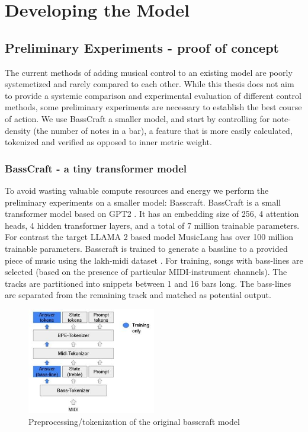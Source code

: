 \section{Developing the Model}

\subsection{Preliminary Experiments - proof of concept}
The current methods of adding musical control to an existing model are poorly systemetized and rarely compared to each other. While this thesis does not aim to provide a systemic comparison and experimental evaluation of different control methods, some preliminary experiments are necessary to establish the best course of action. We use BassCraft a smaller model, and start by controlling for note-density (the number of notes in a bar), a feature that is more easily calculated, tokenized and verified as opposed to inner metric weight.  

\subsubsection{BassCraft -  a tiny transformer model}
To avoid wasting valuable compute resources and energy we perform the preliminary experiments on a smaller model: Basscraft. BassCraft is a small transformer model based on  GPT2 \cite{Radford_Wu_Child_Luan_gpt2_2019}. It has an embedding size of 256, 4 attention heads, 4 hidden transformer layers, and a total of 7 million trainable parameters. For contrast the target LLAMA 2 based model MusicLang has over 100 million trainable parameters. Basscraft is trained to generate a bassline to a provided piece of music using the lakh-midi dataset \cite{Raffel_2016}. For training, songs with bass-lines are selected (based on the presence of particular MIDI-instrument channels). The tracks are partitioned into snippets between 1 and 16 bars long. The bass-lines are separated from the remaining track and matched as potential output. 

\begin{figure}[H]
    \centering
    \includegraphics[width=0.5\textwidth]{IMAGES/Preprocessing1.jpg} 
    \caption{Preprocessing/tokenization of the original basscraft model}
    \label{fig:preprocessing1}
\end{figure}

